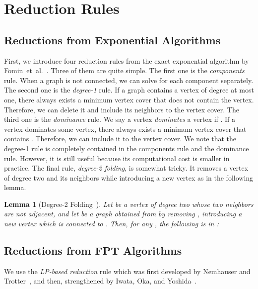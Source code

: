 \documentclass[11pt]{article}
\newtheorem{lemma}{Lemma}
\begin{document}
 \section{Reduction Rules}
\label{sec:reduction}

\subsection{Reductions from Exponential Algorithms}\label{sec:reduction:exponential}

First, we introduce four reduction rules from the exact exponential algorithm by
Fomin~et~al.~\cite{vc_reduction/measure_and_conquer}.
Three of them are quite simple.
The first one is the \emph{components} rule.
When a graph is not connected, we can solve for each component separately.
The second one is the \emph{degree-1} rule.
If a graph contains a vertex of degree at most one, there always exists a
minimum vertex cover that does not contain the vertex.
Therefore, we can delete it and include its neighbors to the vertex cover.
The third one is the \emph{dominance} rule.
We say a vertex  \emph{dominates} a vertex  if .
If a vertex  dominates some vertex, there always exists a minimum vertex cover that contains .
Therefore, we can include it to the vertex cover.
We note that the degree-1 rule is completely
contained in the components rule and the
dominance rule.
However, it is still useful because its computational cost is smaller in practice.
The final rule, \textit{degree-2 folding}, is somewhat tricky.
It removes a vertex of degree two and its neighbors while introducing a new
vertex as in the following lemma.
\begin{lemma}[Degree-2
Folding~\cite{vc_reduction/measure_and_conquer}]
Let  be a vertex of degree two whose two neighbors are not adjacent, and let 
be a graph obtained from  by removing , introducing a new vertex  which is connected to .
Then, for any , the following  is in :

\end{lemma}



\subsection{Reductions from FPT Algorithms}\label{sec:reduction:lp}
We use the \emph{LP-based reduction} rule which was first developed by Nemhauser
and Trotter~\cite{NemhauserT75}, and then, strengthened by Iwata, Oka, and
Yoshida~\cite{bip2/iwata14}.
\end{document}
